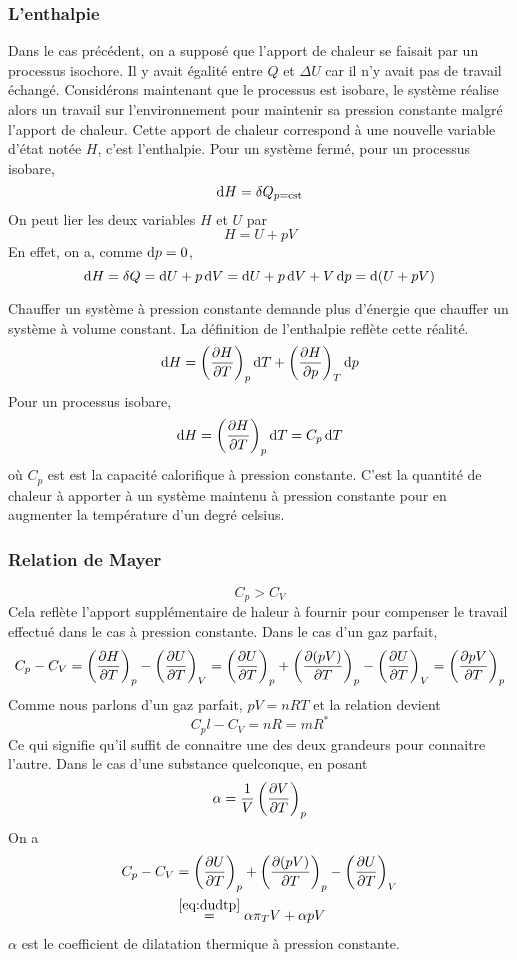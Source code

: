 \subsubsection{L'enthalpie}
Dans le cas précédent, on a supposé que
l'apport de chaleur se faisait par un processus isochore.
Il y avait égalité entre $Q$ et $\Delta U$
car il n'y avait pas de travail échangé.
Considérons maintenant que le processus est isobare,
le système réalise alors un travail sur l'environnement pour maintenir
sa pression constante malgré l'apport de chaleur.
Cette apport de chaleur correspond à une nouvelle variable d'état notée $H$,
c'est l'enthalpie.
Pour un système fermé, pour un processus isobare,
\[ \operatorname{d}\! H = \delta Q_{p = \mathrm{cst}} \]
On peut lier les deux variables $H$ et $U$ par
\[ H = U + pV \]
En effet, on a, comme $\operatorname{d}\! p = 0$,
\[
  \dif H
  = \delta Q
  = \dif U + p \dif V
  = \dif U + p \dif V + V\dif p
  = \dif \left(U + pV\right) %
\]

Chauffer un système à pression constante demande plus d'énergie
que chauffer un système à volume constant.
La définition de l'enthalpie reflète cette réalité.
\[ \operatorname{d}\! H = \left(\frac{\partial H}{\partial T}\right)_p \operatorname{d}\! T +
\left(\frac{\partial H}{\partial p}\right)_T \operatorname{d}\! p \]
Pour un processus isobare,
\[ \operatorname{d}\! H = \left(\frac{\partial H}{\partial T}\right)_p \operatorname{d}\! T = C_p\operatorname{d}\! T \]
où $C_p$ est est la capacité calorifique à pression constante.
C'est la quantité de chaleur à apporter à un système maintenu à pression
constante pour en augmenter la température d'un degré celsius.


\subsubsection{Relation de Mayer}
\[ C_p > C_V \]
Cela reflète l'apport supplémentaire de haleur à fournir pour
compenser le travail effectué dans le cas à pression constante.
Dans le cas d'un gaz parfait,
\[ C_p - C_V = \left(\frac{\partial H}{\partial T}\right)_p -
\left(\frac{\partial U}{\partial T}\right)_V =
\left(\frac{\partial U}{\partial T}\right)_p +
\left(\frac{\partial (pV)}{\partial T}\right)_p -
\left(\frac{\partial U}{\partial T}\right)_V =
\left(\frac{\partial pV}{\partial T}\right)_p \]
Comme nous parlons d'un gaz parfait,
$pV = nRT$ et la relation devient
\[ C_pl - C_V = nR = mR^* \]
Ce qui signifie qu'il suffit de connaitre
une des deux grandeurs pour connaitre l'autre.
Dans le cas d'une substance quelconque, en posant
\[ \alpha = \frac{1}{V} \left(\frac{\partial V}{\partial T}\right)_p \]
On a
\begin{align*}
  C_p - C_V & =
  \left(\frac{\partial U}{\partial T}\right)_p +
  \left(\frac{\partial (pV)}{\partial T}\right)_p -
  \left(\frac{\partial U}{\partial T}\right)_V\\
  & \stackrel{\eqref{eq:dudtp}}{=} \alpha \pi_T V + \alpha p V
\end{align*}
$\alpha$ est le coefficient de dilatation thermique à pression constante.

